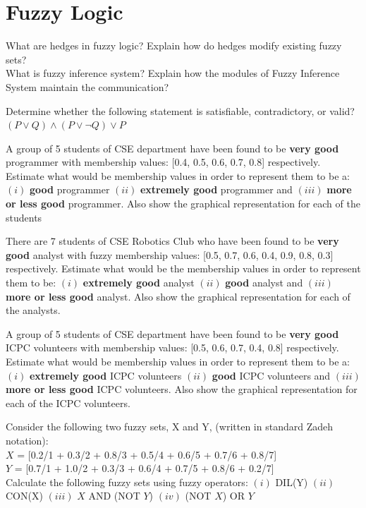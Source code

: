\chapter{Fuzzy Logic}
What are hedges in fuzzy logic? Explain how do hedges modify existing fuzzy sets?\\
What is fuzzy inference system? Explain how the modules of Fuzzy Inference System maintain the communication?


Determine whether the following statement is satisfiable, contradictory, or valid?
$(P \vee Q) \wedge (P \vee \neg Q) \vee P$


 A group of 5 students of CSE department have been found to be \textbf{very good} programmer with membership values: [0.4, 0.5, 0.6, 0.7, 0.8] respectively. Estimate what would be membership values in order to represent them to be a: $(i)$ \textbf{good} programmer $(ii)$ \textbf{extremely good} programmer and $(iii)$ \textbf{more or less good} programmer. Also show the graphical representation for each of the students


 There are 7 students of CSE Robotics Club who have been found to be \textbf{very good} analyst with fuzzy membership values: [0.5, 0.7, 0.6, 0.4, 0.9, 0.8, 0.3] respectively. Estimate what would be the membership values in order to represent them to be: $(i)$ \textbf{extremely good} analyst $(ii)$ \textbf{good} analyst and $(iii)$ \textbf{more or less good} analyst.
Also show the graphical representation for each of the analysts.


 A group of 5 students of CSE department have been found to be \textbf{very good} ICPC volunteers with membership values: [0.5, 0.6, 0.7, 0.4, 0.8] respectively. Estimate what would be membership values in order to represent them to be a: $(i)$ \textbf{extremely good} ICPC volunteers $(ii)$ \textbf{good} ICPC volunteers and $(iii)$ \textbf{more or less good} ICPC volunteers. Also show the graphical representation for each of the ICPC volunteers.


 Consider the following two fuzzy sets, X and Y, (written in standard Zadeh notation):\\
$X$ = [0.2/1 + 0.3/2 + 0.8/3 + 0.5/4 + 0.6/5 + 0.7/6 + 0.8/7]\\
$Y$ = [0.7/1 + 1.0/2 + 0.3/3 + 0.6/4 + 0.7/5 + 0.8/6 + 0.2/7]\\
Calculate the following fuzzy sets using fuzzy operators:
$(i)$ DIL(Y)
$(ii)$ CON(X)
$(iii)$ {$X$ AND (NOT $Y$)}
$(iv)$ {(NOT $X$) OR $Y$}


